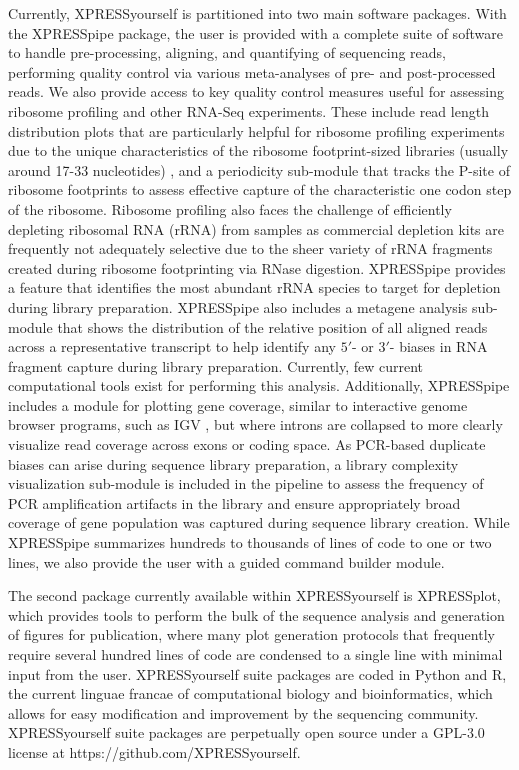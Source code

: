 \documentclass[10pt, oneside]{article}
\begin{document}
Currently, XPRESSyourself is partitioned into two main software packages. With the XPRESSpipe package, the user is provided with a complete suite of software to handle pre-processing, aligning, and quantifying of sequencing reads, performing quality control via various meta-analyses of pre- and post-processed reads. We also provide access to key quality control measures useful for assessing ribosome profiling and other RNA-Seq experiments. These include read length distribution plots that are particularly helpful for ribosome profiling experiments due to the unique characteristics of the ribosome footprint-sized libraries (usually around 17-33 nucleotides) \cite{fp_range}, and a periodicity sub-module that tracks the P-site of ribosome footprints to assess effective capture of the characteristic one codon step of the ribosome. Ribosome profiling also faces the challenge of efficiently depleting ribosomal RNA (rRNA) from samples as commercial depletion kits are frequently not adequately selective due to the sheer variety of rRNA fragments created during ribosome footprinting via RNase digestion. XPRESSpipe provides a feature that identifies the most abundant rRNA species to target for depletion during library preparation. XPRESSpipe also includes a metagene analysis sub-module that shows the distribution of the relative position of all aligned reads across a representative transcript to help identify any $5'$- or $3'$- biases in RNA fragment capture during library preparation. Currently, few current computational tools exist for performing this analysis. Additionally, XPRESSpipe includes a module for plotting gene coverage, similar to interactive genome browser programs, such as IGV \cite{igv}, but where introns are collapsed to more clearly visualize read coverage across exons or coding space. As PCR-based duplicate biases can arise during sequence library preparation, a library complexity visualization sub-module is included in the pipeline to assess the frequency of PCR amplification artifacts in the library and ensure appropriately broad coverage of gene population was captured during sequence library creation. While XPRESSpipe summarizes hundreds to thousands of lines of code to one or two lines, we also provide the user with a guided command builder module. \par

The second package currently available within XPRESSyourself is XPRESSplot, which provides tools to perform the bulk of the sequence analysis and generation of figures for publication, where many plot generation protocols that frequently require several hundred lines of code are condensed to a single line with minimal input from the user. XPRESSyourself suite packages are coded in Python and R, the current linguae francae of computational biology and bioinformatics, which allows for easy modification and improvement by the sequencing community. XPRESSyourself suite packages are perpetually open source under a GPL-3.0 license at https://github.com/XPRESSyourself. \par
\end{document}
